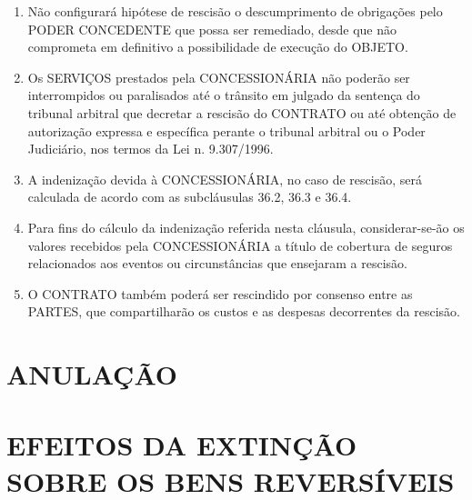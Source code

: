 \documentclass[a4paper,11pt]{report} %
\begin{document}
\begin{enumerate}
\item \label{itm:JLSY} Não configurará hipótese de rescisão o descumprimento de obrigações pelo PODER CONCEDENTE que possa ser remediado, desde que não comprometa em definitivo a possibilidade de execução do OBJETO.

\item \label{itm:KHR7} Os SERVIÇOS prestados pela CONCESSIONÁRIA não poderão ser interrompidos ou paralisados até o trânsito em julgado da sentença do tribunal arbitral que decretar a rescisão do CONTRATO ou até obtenção de autorização expressa e específica perante o tribunal arbitral ou o Poder Judiciário, nos termos da Lei n. 9.307/1996.

\item \label{itm:NY8T} A indenização devida à CONCESSIONÁRIA, no caso de rescisão, será calculada de acordo com as subcláusulas 36.2, 36.3 e 36.4.

\item \label{itm:82FJ} Para fins do cálculo da indenização referida nesta cláusula, considerar-se-ão os valores recebidos pela CONCESSIONÁRIA a título de cobertura de seguros relacionados aos eventos ou circunstâncias que ensejaram a rescisão.

\item \label{itm:95YC} O CONTRATO também poderá ser rescindido por consenso entre as PARTES, que compartilharão os custos e as despesas decorrentes da rescisão.
\end{enumerate}

\section{ANULAÇÃO}
\label{sec:P6WD}

\section{EFEITOS DA EXTINÇÃO SOBRE OS BENS REVERSÍVEIS}
\label{sec:MYB9}
\end{document}
